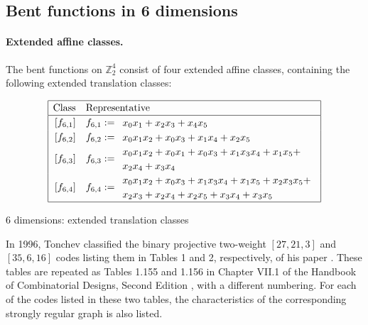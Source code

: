 \documentclass[12pt,a4paper]{article}
\newcommand{\mb}[1]{\mathbb{#1}}
\newcommand{\Z}{\mb{Z}}
\begin{document}
\subsection{Bent functions in 6 dimensions}
\paragraph*{Extended affine classes.}
%
The bent functions on $\Z_2^4$ consist of four
extended affine classes, containing the following extended translation classes:

\begin{table}[!bhpt] %
\begin{align*}
\def\arraystretch{1.2}
\begin{array}{|cl|}
\hline
\text{Class} &
\text{Representative}
\\
\hline
\,[f_{6,1}] & f_{6,1} :=
\begin{array}{l}
x_{0} x_{1} + x_{2} x_{3} + x_{4} x_{5}
\end{array}
\\
\,[f_{6,2}] & f_{6,2} :=
\begin{array}{l}
x_{0} x_{1} x_{2} + x_{0} x_{3} + x_{1} x_{4} + x_{2} x_{5}
\end{array}
\\
\,[f_{6,3}] & f_{6,3} :=
\begin{array}{l}
x_{0} x_{1} x_{2} + x_{0} x_{1} + x_{0} x_{3} + x_{1} x_{3} x_{4} + x_{1} x_{5} +
\\
x_{2} x_{4} + x_{3} x_{4}
\end{array}
\\
\,[f_{6,4}] & f_{6,4} :=
\begin{array}{l}
x_{0} x_{1} x_{2} + x_{0} x_{3} + x_{1} x_{3} x_{4} + x_{1} x_{5} + x_{2} x_{3} x_{5} +
\\
x_{2} x_{3} + x_{2} x_{4} + x_{2} x_{5} + x_{3} x_{4} + x_{3} x_{5}
\end{array}
\\
\hline
\end{array}
\end{align*}
\caption{6 dimensions: extended translation classes}
\label{tab-c6_ET_classes}
\end{table}

In 1996, Tonchev classified the binary projective two-weight $[27,21,3]$ and $[35,6,16]$ codes
listing them in Tables 1 and 2, respectively, of his paper \cite{Ton96uniformly}.
These tables are repeated as Tables 1.155 and 1.156 in Chapter VII.1 of the Handbook of
Combinatorial Designs, Second Edition \cite{Ton07codes},
with a different numbering.
For each of the codes listed in these two tables, the characteristics of the corresponding
strongly regular graph is also listed.
\end{document}

